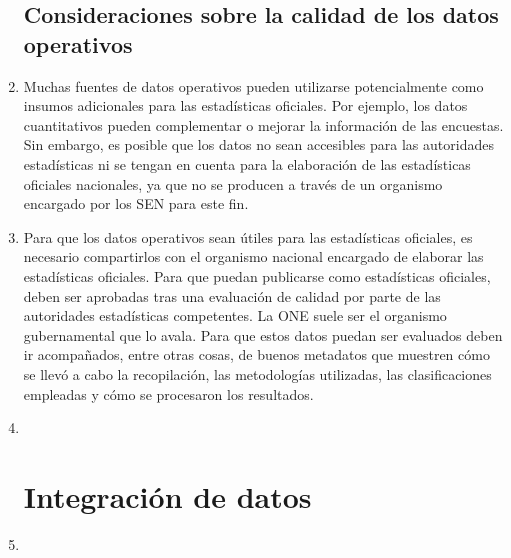 \documentclass[
]{book}
\begin{document}
\begin{enumerate}
{  \subsection{Consideraciones sobre la calidad de los datos operativos}\label{consideraciones-sobre-la-calidad-de-los-datos-operativos}}
\item
  Muchas fuentes de datos operativos pueden utilizarse potencialmente como insumos adicionales para las estadísticas oficiales. Por ejemplo, los datos cuantitativos pueden complementar o mejorar la información de las encuestas. Sin embargo, es posible que los datos no sean accesibles para las autoridades estadísticas ni se tengan en cuenta para la elaboración de las estadísticas oficiales nacionales, ya que no se producen a través de un organismo encargado por los SEN para este fin.
\item
  Para que los datos operativos sean útiles para las estadísticas oficiales, es necesario compartirlos con el organismo nacional encargado de elaborar las estadísticas oficiales. Para que puedan publicarse como estadísticas oficiales, deben ser aprobadas tras una evaluación de calidad por parte de las autoridades estadísticas competentes. La ONE suele ser el organismo gubernamental que lo avala. Para que estos datos puedan ser evaluados deben ir acompañados, entre otras cosas, de buenos metadatos que muestren cómo se llevó a cabo la recopilación, las metodologías utilizadas, las clasificaciones empleadas y cómo se procesaron los resultados.
\item ~
  \hypertarget{integraciuxf3n-de-datos}{%
  \section{Integración de datos}\label{integraciuxf3n-de-datos}}
\item ~
  \hypertarget{consideraciones-sobre-las-estaduxedsticas-de-pdi}{%
}
\end{enumerate}
\end{document}
